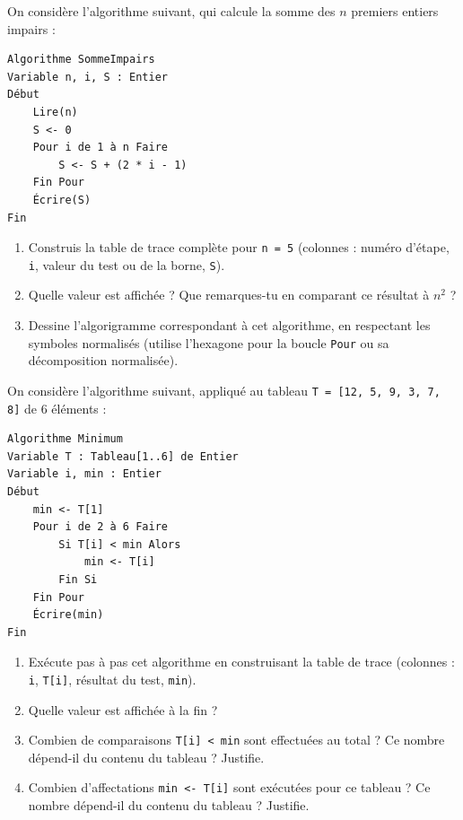 \documentclass[11pt]{article}
\begin{document}
\begin{exercice}
On considère l'algorithme suivant, qui calcule la somme des $n$ premiers entiers impairs :
\begin{lstlisting}
Algorithme SommeImpairs
Variable n, i, S : Entier
Début
    Lire(n)
    S <- 0
    Pour i de 1 à n Faire
        S <- S + (2 * i - 1)
    Fin Pour
    Écrire(S)
Fin
\end{lstlisting}
\begin{enumerate}
\item Construis la table de trace complète pour \texttt{n = 5} (colonnes : numéro d'étape, \texttt{i}, valeur du test ou de la borne, \texttt{S}).
\item Quelle valeur est affichée ? Que remarques-tu en comparant ce résultat à $n^2$ ?
\item Dessine l'algorigramme correspondant à cet algorithme, en respectant les symboles normalisés (utilise l'hexagone pour la boucle \texttt{Pour} ou sa décomposition normalisée).
\end{enumerate}
\end{exercice}

\begin{exercice}
On considère l'algorithme suivant, appliqué au tableau \texttt{T = [12, 5, 9, 3, 7, 8]} de 6 éléments :
\begin{lstlisting}
Algorithme Minimum
Variable T : Tableau[1..6] de Entier
Variable i, min : Entier
Début
    min <- T[1]
    Pour i de 2 à 6 Faire
        Si T[i] < min Alors
            min <- T[i]
        Fin Si
    Fin Pour
    Écrire(min)
Fin
\end{lstlisting}
\begin{enumerate}
\item Exécute pas à pas cet algorithme en construisant la table de trace (colonnes : \texttt{i}, \texttt{T[i]}, résultat du test, \texttt{min}).
\item Quelle valeur est affichée à la fin ?
\item Combien de comparaisons \texttt{T[i] < min} sont effectuées au total ? Ce nombre dépend-il du contenu du tableau ? Justifie.
\item Combien d'affectations \texttt{min <- T[i]} sont exécutées pour ce tableau ? Ce nombre dépend-il du contenu du tableau ? Justifie.
\end{enumerate}
\end{exercice}
\end{document}
